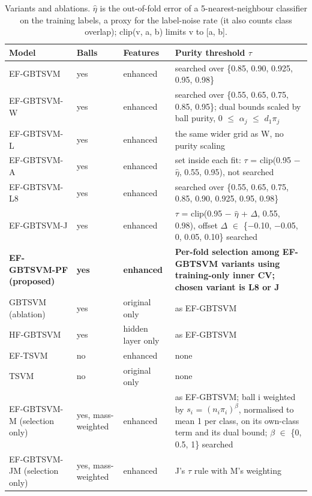 \documentclass[conference,a4paper]{IEEEtran}
\begin{document}
\begin{table}[!t]
\centering
\small
\caption{Variants and ablations. $\hat{\eta}$ is the out-of-fold error of a 5-nearest-neighbour classifier on the training labels, a proxy for the label-noise rate (it also counts class overlap); clip(v, a, b) limits v to [a, b].}
\label{tab:1}
\begin{tabularx}{\textwidth}{lllX}
\toprule
Model & Balls & Features & Purity threshold $\tau$ \\
\midrule
EF-GBTSVM & yes & enhanced & searched over \{0.85, 0.90, 0.925, 0.95, 0.98\} \\
EF-GBTSVM-W & yes & enhanced & searched over \{0.55, 0.65, 0.75, 0.85, 0.95\}; dual bounds scaled by ball purity, 0 $\le$ $\alpha_j$ $\le$ $d_{1}\pi_j$ \\
EF-GBTSVM-L & yes & enhanced & the same wider grid as W, no purity scaling \\
EF-GBTSVM-A & yes & enhanced & set inside each fit: $\tau$ = clip(0.95 $-$ $\hat{\eta}$, 0.55, 0.95), not searched \\
EF-GBTSVM-L8 & yes & enhanced & searched over \{0.55, 0.65, 0.75, 0.85, 0.90, 0.925, 0.95, 0.98\} \\
EF-GBTSVM-J & yes & enhanced & $\tau$ = clip(0.95 $-$ $\hat{\eta}$ + $\Delta$, 0.55, 0.98), offset $\Delta$ $\in$ \{$-$0.10, $-$0.05, 0, 0.05, 0.10\} searched \\
\rowcolor{blue!10}\textbf{EF-GBTSVM-PF (proposed)} & \textbf{yes} & \textbf{enhanced} & \textbf{Per-fold selection among EF-GBTSVM variants using training-only inner CV; chosen variant is L8 or J} \\
GBTSVM (ablation) & yes & original only & as EF-GBTSVM \\
HF-GBTSVM & yes & hidden layer only & as EF-GBTSVM \\
EF-TSVM & no & enhanced & none \\
TSVM & no & original only & none \\
EF-GBTSVM-M (selection only) & yes, mass-weighted & enhanced & as EF-GBTSVM; ball i weighted by $s_i$ = $(n_i\pi_i)^{\beta}$, normalised to mean 1 per class, on its own-class term and its dual bound; $\beta$ $\in$ \{0, 0.5, 1\} searched \\
EF-GBTSVM-JM (selection only) & yes, mass-weighted & enhanced & J's $\tau$ rule with M's weighting \\
\bottomrule
\end{tabularx}
\end{table}
\end{document}
